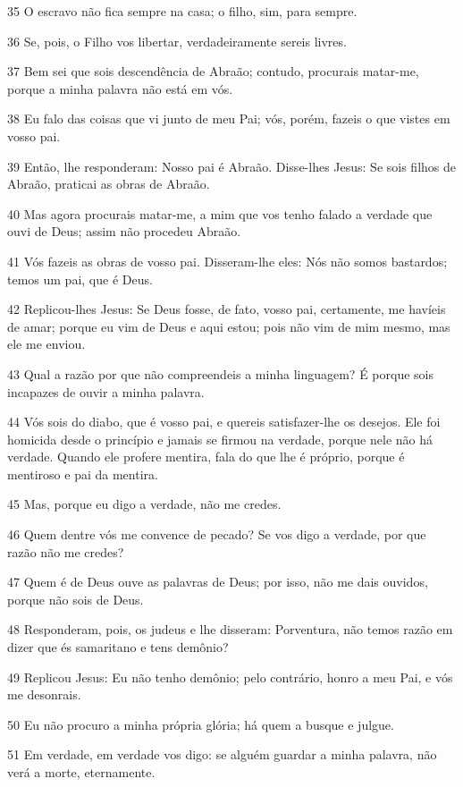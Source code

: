 \par 35 O escravo não fica sempre na casa; o filho, sim, para sempre.
\par 36 Se, pois, o Filho vos libertar, verdadeiramente sereis livres.
\par 37 Bem sei que sois descendência de Abraão; contudo, procurais matar-me, porque a minha palavra não está em vós.
\par 38 Eu falo das coisas que vi junto de meu Pai; vós, porém, fazeis o que vistes em vosso pai.
\par 39 Então, lhe responderam: Nosso pai é Abraão. Disse-lhes Jesus: Se sois filhos de Abraão, praticai as obras de Abraão.
\par 40 Mas agora procurais matar-me, a mim que vos tenho falado a verdade que ouvi de Deus; assim não procedeu Abraão.
\par 41 Vós fazeis as obras de vosso pai. Disseram-lhe eles: Nós não somos bastardos; temos um pai, que é Deus.
\par 42 Replicou-lhes Jesus: Se Deus fosse, de fato, vosso pai, certamente, me havíeis de amar; porque eu vim de Deus e aqui estou; pois não vim de mim mesmo, mas ele me enviou.
\par 43 Qual a razão por que não compreendeis a minha linguagem? É porque sois incapazes de ouvir a minha palavra.
\par 44 Vós sois do diabo, que é vosso pai, e quereis satisfazer-lhe os desejos. Ele foi homicida desde o princípio e jamais se firmou na verdade, porque nele não há verdade. Quando ele profere mentira, fala do que lhe é próprio, porque é mentiroso e pai da mentira.
\par 45 Mas, porque eu digo a verdade, não me credes.
\par 46 Quem dentre vós me convence de pecado? Se vos digo a verdade, por que razão não me credes?
\par 47 Quem é de Deus ouve as palavras de Deus; por isso, não me dais ouvidos, porque não sois de Deus.
\par 48 Responderam, pois, os judeus e lhe disseram: Porventura, não temos razão em dizer que és samaritano e tens demônio?
\par 49 Replicou Jesus: Eu não tenho demônio; pelo contrário, honro a meu Pai, e vós me desonrais.
\par 50 Eu não procuro a minha própria glória; há quem a busque e julgue.
\par 51 Em verdade, em verdade vos digo: se alguém guardar a minha palavra, não verá a morte, eternamente.
